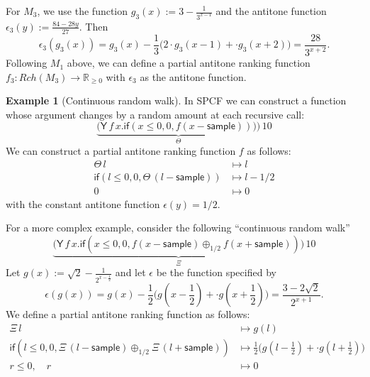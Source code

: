 \documentclass{article}
\newcommand{\nnReal}{\mathbb{R}_{{\geq}0}}
\newcommand{\tY}{\mathsf{Y}}
\newcommand{\tif}[3]{\mathsf{if}(#1, #2, #3)} %
\newcommand{\tsample}{\mathsf{sample}}
\theoremstyle{definition}
\newtheorem{example}{Example}
\theoremstyle{lemma}
\theoremstyle{remark}
\begin{document}
For $M_3$, we use the function $g_3(x) := 3 - \frac{1}{3^{x-1}}$ and the antitone function $\epsilon_3(y) := \frac{84-28y}{27}$. 
Then
\[
\epsilon_3(g_3(x)) = g_3(x) - \dfrac{1}{3}\big(2 \cdot g_3(x-1) + \cdot g_3(x+2) \big) = 
\frac{28}{3^{x+2}}.
\]
Following $M_1$ above, we can define a partial antitone ranking function $f_3 : \mathit{Rch}(M_3) \to \nnReal$ with $\epsilon_3$ as the antitone function.

\begin{example}[Continuous random walk]\label{ex:raven complex}
In SPCF we can construct a function whose argument changes by a random amount at each recursive call:
\[
\underbrace{\big
(\tY \, f \, x . \tif{x \leq 0}{0}{f(x - \tsample))} \big)}_{\Theta} \, 10
\]
We can construct a partial antitone ranking function $f$ as follows:
\begin{align*}
\Theta \, l 
&\mapsto 
l
\\
\tif{l \leq 0}{0}{\Theta \, (l - \tsample)}
&\mapsto
l - 1/2
\\
0 &\mapsto 0
\end{align*}
with the constant antitone function $\epsilon(y) = 1/2$.

For a more complex example, consider the following ``continuous random walk''
\[
\underbrace{\big
(\tY \, f \, x . \tif{x \leq 0}{0}{f(x - \tsample) \oplus_{1/2} f(x + \tsample)} \big)}_{\Xi} \, 10
\]
Let $g(x) := \sqrt{2} - \frac{1}{2^{x-\frac{1}{2}}}$ and let $\epsilon$ be the function specified by
\[
\epsilon(g(x)) = g(x) - \dfrac{1}{2}\Big(g(x - \dfrac{1}{2}) + \cdot g(x + \dfrac{1}{2}) \Big) = 
\dfrac{3 - 2\sqrt{2}}{2^{x+1}}.
\]
We define a partial antitone ranking function as follows:
\begin{align*}
\Xi \, l 
&\mapsto 
g(l)
\\
\tif{l \leq 0}{0}{\Xi \, (l - \tsample) \oplus_{1/2} \Xi \, (l + \tsample)}
&\mapsto
\frac{1}{2}\big(g(l - \frac{1}{2}) + \cdot g(l + \frac{1}{2}) \big)
\\
r \leq 0, \quad r &\mapsto 0
\end{align*}
\end{example}
\end{document}
